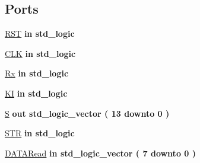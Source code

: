 \subsection*{Ports}
 \begin{DoxyCompactItemize}
\item 
\hyperlink{class_r_s232_read_a98682ef7de2714e5bab788a2e2ff1b7f}{R\+S\+T}  {\bfseries {\bfseries \textcolor{keywordflow}{in}\textcolor{vhdlchar}{ }}} {\bfseries \textcolor{comment}{std\+\_\+logic}\textcolor{vhdlchar}{ }} 
\item 
\hyperlink{class_r_s232_read_ab5d0ea9e968d49d94da9db07a979d402}{C\+L\+K}  {\bfseries {\bfseries \textcolor{keywordflow}{in}\textcolor{vhdlchar}{ }}} {\bfseries \textcolor{comment}{std\+\_\+logic}\textcolor{vhdlchar}{ }} 
\item 
\hyperlink{class_r_s232_read_a5b7b5dfa3fdd403b397fc3a20f75ec69}{Rx}  {\bfseries {\bfseries \textcolor{keywordflow}{in}\textcolor{vhdlchar}{ }}} {\bfseries \textcolor{comment}{std\+\_\+logic}\textcolor{vhdlchar}{ }} 
\item 
\hyperlink{class_r_s232_read_a97c032966a659a6a0d6d0b7ff63752eb}{K\+I}  {\bfseries {\bfseries \textcolor{keywordflow}{in}\textcolor{vhdlchar}{ }}} {\bfseries \textcolor{comment}{std\+\_\+logic}\textcolor{vhdlchar}{ }} 
\item 
\hyperlink{class_r_s232_read_a6300ccdf7d914444dab42a11189bc0d1}{S}  {\bfseries {\bfseries \textcolor{keywordflow}{out}\textcolor{vhdlchar}{ }}} {\bfseries \textcolor{comment}{std\+\_\+logic\+\_\+vector}\textcolor{vhdlchar}{ }\textcolor{vhdlchar}{(}\textcolor{vhdlchar}{ }\textcolor{vhdlchar}{ } \textcolor{vhdldigit}{13} \textcolor{vhdlchar}{ }\textcolor{keywordflow}{downto}\textcolor{vhdlchar}{ }\textcolor{vhdlchar}{ } \textcolor{vhdldigit}{0} \textcolor{vhdlchar}{ }\textcolor{vhdlchar}{)}\textcolor{vhdlchar}{ }} 
\item 
\hyperlink{class_r_s232_read_a2362aafea593a78b601ede05bb71edd7}{S\+T\+R}  {\bfseries {\bfseries \textcolor{keywordflow}{in}\textcolor{vhdlchar}{ }}} {\bfseries \textcolor{comment}{std\+\_\+logic}\textcolor{vhdlchar}{ }} 
\item 
\hyperlink{class_r_s232_read_a057ebbf5fb874dd95b022eed939536e0}{D\+A\+T\+A\+Read}  {\bfseries {\bfseries \textcolor{keywordflow}{in}\textcolor{vhdlchar}{ }}} {\bfseries \textcolor{comment}{std\+\_\+logic\+\_\+vector}\textcolor{vhdlchar}{ }\textcolor{vhdlchar}{(}\textcolor{vhdlchar}{ }\textcolor{vhdlchar}{ } \textcolor{vhdldigit}{7} \textcolor{vhdlchar}{ }\textcolor{keywordflow}{downto}\textcolor{vhdlchar}{ }\textcolor{vhdlchar}{ } \textcolor{vhdldigit}{0} \textcolor{vhdlchar}{ }\textcolor{vhdlchar}{)}\textcolor{vhdlchar}{ }} 

\end{DoxyCompactItemize}

